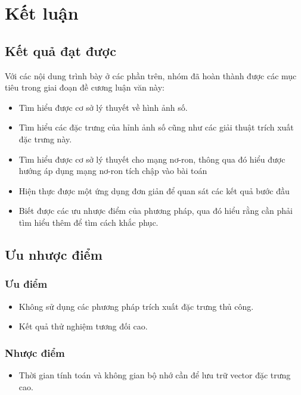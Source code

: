 \documentclass[a4paper,14pt]{extreport}
\begin{document}
\chapter{Kết luận}
\section{Kết quả đạt được}

Với các nội dung trình bày ở các phần trên, nhóm đã hoàn thành được các mục tiêu trong giai đoạn đề cương luận văn này:
\begin{itemize}
    \item Tìm hiểu được cơ sở lý thuyết về hình ảnh số.
    \item Tìm hiểu các đặc trưng của hỉnh ảnh số cũng như các giải thuật trích xuất đặc trưng này.
    \item Tìm hiểu được cơ sở lý thuyết cho mạng nơ-ron, thông qua đó hiểu được hướng áp dụng mạng nơ-ron tích chập vào bài toán
    \item Hiện thực được một ứng dụng đơn giản để quan sát các kết quả bước đầu
    \item Biết được các ưu nhược điểm của phương pháp, qua đó hiểu rằng cần phải tìm hiểu thêm để tìm cách khắc phục.
\end{itemize}

\section{Ưu nhược điểm}

\subsection{Ưu điểm}

\begin{itemize}
    \item Không sử dụng các phương pháp trích xuất đặc trưng thủ công.
    \item Kết quả thử nghiệm tương đối cao.
\end{itemize}

\subsection{Nhược điểm}

\begin{itemize}
    \item Thời gian tính toán và không gian bộ nhớ cần để lưu trữ vector đặc trưng cao.
\end{itemize}
\end{document}
